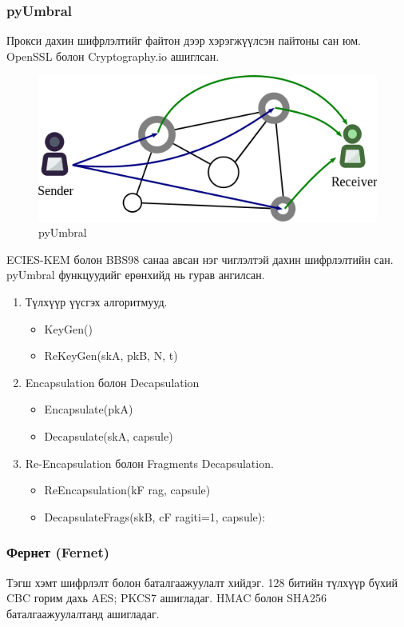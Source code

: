 \subsubsection*{pyUmbral}
Прокси дахин шифрлэлтийг файтон дээр хэрэгжүүлсэн пайтоны сан юм. OpenSSL болон Cryptography.io ашиглсан.
\begin{figure}[ht]
    \centering
    \includegraphics[scale=0.5]{Figures/umbral.png}
    \caption{pyUmbral}
    \label{fig:pyUmbral}
\end{figure}

ECIES-KEM болон BBS98 санаа авсан нэг чиглэлтэй дахин шифрлэлтийн сан. pyUmbral функцуудийг ерөнхийд нь гурав ангилсан.
\begin{enumerate}
    \item Түлхүүр үүсгэх алгоритмууд.
          \begin{itemize}
              \item KeyGen()
              \item ReKeyGen(skA, pkB, N, t)
          \end{itemize}
    \item Encapsulation болон Decapsulation
          \begin{itemize}
              \item Encapsulate(pkA)
              \item Decapsulate(skA, capsule)
          \end{itemize}
    \item Re-Encapsulation болон Fragments Decapsulation.
          \begin{itemize}
              \item ReEncapsulation(kF rag, capsule)
              \item DecapsulateFrags(skB, {cF ragi}ti=1, capsule):
          \end{itemize}
\end{enumerate}

\subsubsection*{Фернет (Fernet)}
Тэгш хэмт шифрлэлт  болон баталгаажуулалт хийдэг. 128 битийн түлхүүр бүхий CBC горим дахь AES; PKCS7 ашигладаг. HMAC болон SHA256 баталгаажуулалтанд ашигладаг.

